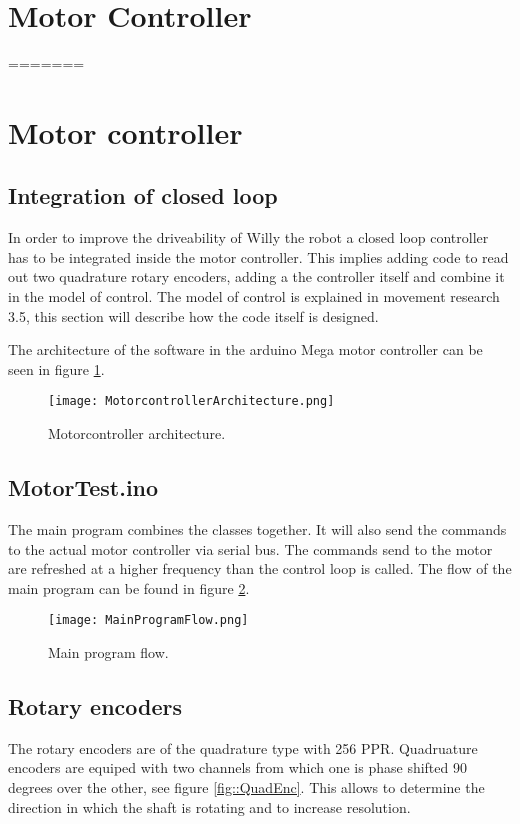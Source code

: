 \section{Motor Controller}

\newpage
=======
\section{Motor controller}

\subsection{Integration of closed loop}
In order to improve the driveability of Willy the robot a closed loop controller has to be integrated inside the motor controller. 
This implies adding code to read out two quadrature rotary encoders, adding a the controller itself and combine it in the model of control.
The model of control is explained in movement research 3.5, this section will describe how the code itself is designed.

The architecture of the software in the arduino Mega motor controller can be seen in figure \ref{fig::Motorconarc}.

\begin{figure}[H]
\centering
\texttt{[image: MotorcontrollerArchitecture.png]}
\caption{Motorcontroller architecture.}
\label{fig::Motorconarc}
\end{figure}

\subsection{MotorTest.ino}
The main program combines the classes together. It will also send the commands to the actual motor controller via serial bus. The commands send to the motor are refreshed at a higher frequency than the control loop is called. The flow of the main program can be found in figure \ref{fig::MPF}.

\begin{figure}[H]
\centering
\texttt{[image: MainProgramFlow.png]}
\caption{Main program flow.}
\label{fig::MPF}
\end{figure}


\subsection{Rotary encoders}
The rotary encoders are of the quadrature type with 256 PPR. 
Quadruature encoders are equiped with two channels from which one is phase shifted 90 degrees over the other, see figure \ref{fig::QuadEnc}.
This allows to determine the direction in which the shaft is rotating and to increase resolution.

